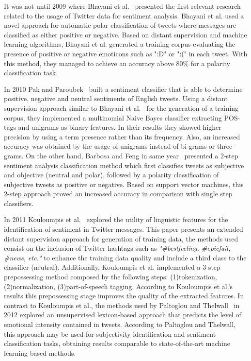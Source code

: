 It was not until 2009 where Bhayani et al.~\cite{go2009twitter} presented the first relevant research related to the usage of Twitter data for sentiment analysis. Bhayani et al. used a novel approach for automatic polar-classification of tweets where messages are classified as either positive or negative. Based on distant supervision and machine learning algorithms, Bhayani et al. generated a training corpus evaluating the presence of positive or negative emoticons such as ":D" or ":(" in each tweet. With this method, they managed to achieve an accuracy above 80\% for a polarity classification task.

In 2010 Pak and Paroubek~\cite{pak2010twitter} built a sentiment classifier that is able to determine positive, negative and neutral sentiments of English tweets. Using a distant supervision approach similar to Bhayani et al.~\cite{go2009twitter} for the generation of a training corpus, they implemented a multinomial Naive Bayes classifier extracting POS-tags and unigrams as binary features. In their results they showed higher precision by using a term presence rather than its frequency. Also, an increased accuracy was obtained by the usage of unigrams instead of bi-grams or three-grams. On the other hand, Barbosa and Feng in same year~\cite{barbosa2010robust} presented a 2-step sentiment analysis classification method which first classifies tweets as subjective and objective (neutral and polar), followed by a polarity classification of subjective tweets as positive or negative. Based on support vector machines, this 2-step approach proved an increased accuracy in comparison with single step classifiers. 

In 2011 Kouloumpis et al.~\cite{kouloumpis2011twitter} explored the utility of linguistic features
for the identification of sentiment in Twitter messages. This paper presents an extended distant supervision approach for generation of training data, the methods used consist on the inclusion of Twitter hashtags such as \textit{"\#bestfeeling, \#epicfail, \#news, etc."} to enhance the training data quality and include a third class to the classifier (neutral). Additionally, Kouloumpis et al. implemented a 3-step prepossessing method composed by the following steps: (1)tokenization, (2)normalization, (3)part-of-speech tagging. According to Kouloumpis et al.'s results this prepossessing stage improves the quality of the extracted features. In contrast to Kouloumpis et al., the methods used by Paltoglou and Thelwall~\cite{paltoglou2012twitter} in 2012 explored an unsupervised lexicon-based approach that predicts the level of emotional intensity contained in tweets. According to Paltoglou and Thelwall, this approach may be used for subjectivity identification and sentiment classification tasks, obtaining results comparable to state-of-the-art machine learning based methods.


